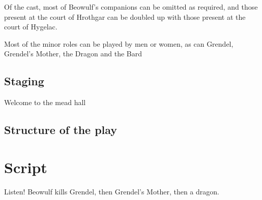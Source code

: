 \documentclass[a4paper]{article}
\begin{document}
Of the cast, most of Beowulf's companions can be omitted as required, and those
present at the court of Hrothgar can be doubled up with those present at the court
of Hygelac. 

Most of the minor roles can be played by men or women, as can Grendel, Grendel's
Mother, the Dragon and the Bard

\subsection{Staging}%

Welcome to the mead hall\!

\subsection{Structure of the play}%

\section{Script}

Listen! Beowulf kills Grendel, then Grendel's Mother, then a dragon. 
\end{document}
